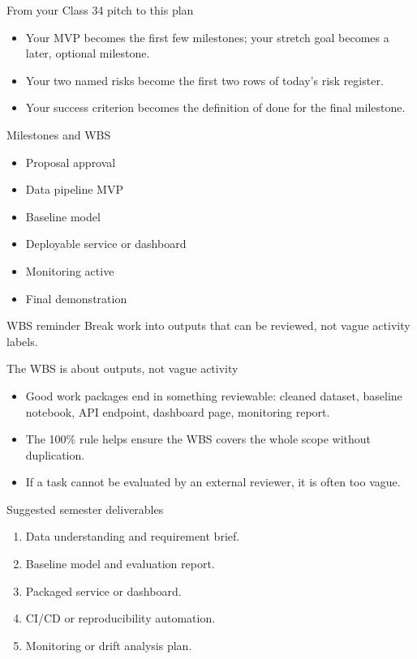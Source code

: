 \begin{frame}{From your Class 34 pitch to this plan}
\begin{itemize}
\item Your MVP becomes the first few milestones; your stretch goal becomes a later, optional milestone.
\item Your two named risks become the first two rows of today's risk register.
\item Your success criterion becomes the definition of done for the final milestone.
\end{itemize}
\coursefooter
\end{frame}

\begin{frame}{Milestones and WBS}
\begin{itemize}
\item Proposal approval
\item Data pipeline MVP
\item Baseline model
\item Deployable service or dashboard
\item Monitoring active
\item Final demonstration
\end{itemize}
\begin{block}{WBS reminder}
Break work into outputs that can be reviewed, not vague activity labels.
\end{block}
\coursefooter
\end{frame}

\begin{frame}{The WBS is about outputs, not vague activity}
\begin{itemize}
\item Good work packages end in something reviewable: cleaned dataset, baseline notebook, API endpoint, dashboard page, monitoring report.
\item The 100\% rule helps ensure the WBS covers the whole scope without duplication.
\item If a task cannot be evaluated by an external reviewer, it is often too vague.
\end{itemize}
\coursefooter
\end{frame}

\begin{frame}{Suggested semester deliverables}
\begin{enumerate}
\item Data understanding and requirement brief.
\item Baseline model and evaluation report.
\item Packaged service or dashboard.
\item CI/CD or reproducibility automation.
\item Monitoring or drift analysis plan.
\end{enumerate}
\coursefooter
\end{frame}


